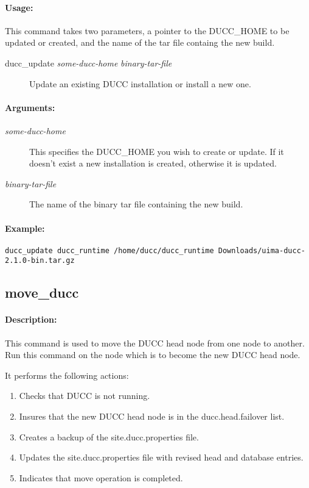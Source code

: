     \paragraph{Usage:}
        This command takes two parameters, a pointer to the DUCC\_HOME to be updated or created,
        and the name of the tar file containg the new build.
    \begin{description}
      \item[ducc\_update {\em some-ducc-home} {\em binary-tar-file}]
        Update an existing DUCC installation or install a new one.
    \end{description}

    \paragraph{Arguments:}
    \begin{description}
        \item[{\em some-ducc-home}] 
          This specifies the DUCC\_HOME you wish to create or update.  If it doesn't exist a new
          installation is created, otherwise it is updated.
        \item[{\em binary-tar-file}]
          The name of the binary tar file containing the new build.
     \end{description}

    \paragraph{Example:}
\begin{verbatim}
ducc_update ducc_runtime /home/ducc/ducc_runtime Downloads/uima-ducc-2.1.0-bin.tar.gz 
\end{verbatim}


\subsection{move\_ducc}
\label{subsec:admin.move-ducc}

    \paragraph{Description:}
        This command is used to move the DUCC head node from one node to another.
        Run this command on the node which is to become the new DUCC head node.

        It performs the following actions:
        \begin{enumerate}
          \item Checks that DUCC is not running.
          \item Insures that the new DUCC head node is in the ducc.head.failover list.
          \item Creates a backup of the site.ducc.properties file.
          \item Updates the site.ducc.properties file with revised head and database entries.
          \item Indicates that move operation is completed.
        \end{enumerate}

